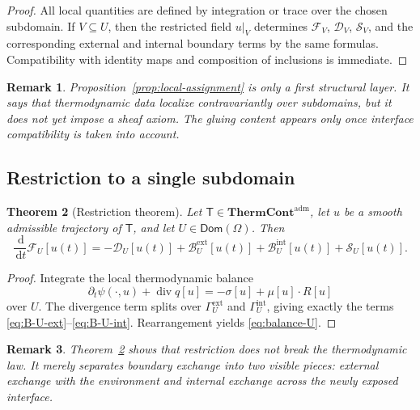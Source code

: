 \documentclass[10pt,a4paper]{amsart}
\newtheorem{theorem}{Theorem}[section]
\newtheorem{remark}[theorem]{Remark}
\newcommand{\Om}{\Omega}
\newcommand{\diver}{\operatorname{div}}
\newcommand{\dd}{\,\mathrm{d}}
\newcommand{\F}{\mathcal{F}}
\newcommand{\Diss}{\mathcal{D}}
\newcommand{\Bnd}{\mathcal{B}}
\newcommand{\Src}{\mathcal{S}}
\newcommand{\ThermAdm}{\mathbf{ThermCont}^{\mathrm{adm}}}
\begin{document}
\begin{proof}
All local quantities are defined by integration or trace over the chosen subdomain.
If \(V\subseteq U\), then the restricted field \(u|_V\) determines \(\F_V\),
\(\Diss_V\), \(\Src_V\), and the corresponding external and internal boundary terms
by the same formulas. Compatibility with identity maps and composition of inclusions
is immediate.
\end{proof}

\begin{remark}
Proposition~\ref{prop:local-assignment} is only a first structural layer. It says
that thermodynamic data localize contravariantly over subdomains, but it does not
yet impose a sheaf axiom. The gluing content appears only once interface
compatibility is taken into account.
\end{remark}

\subsection{Restriction to a single subdomain}

\begin{theorem}[Restriction theorem]\label{thm:restriction}
Let \(\mathsf{T}\in\ThermAdm\), let \(u\) be a smooth admissible trajectory of
\(\mathsf{T}\), and let \(U\in\mathsf{Dom}(\Om)\). Then
\begin{equation}\label{eq:balance-U}
\frac{\dd}{\dd t}\F_U[u(t)]
=
-\Diss_U[u(t)]
+\Bnd_U^{\mathrm{ext}}[u(t)]
+\Bnd_U^{\mathrm{int}}[u(t)]
+\Src_U[u(t)].
\end{equation}
\end{theorem}

\begin{proof}
Integrate the local thermodynamic balance
\[
\partial_t \psi(\cdot,u) + \diver q[u]
=
-\sigma[u] + \mu[u]\cdot R[u]
\]
over \(U\). The divergence term splits over \(\Gamma_U^{\mathrm{ext}}\) and
\(\Gamma_U^{\mathrm{int}}\), giving exactly the terms
\eqref{eq:B-U-ext}--\eqref{eq:B-U-int}. Rearrangement yields
\eqref{eq:balance-U}.
\end{proof}

\begin{remark}
Theorem~\ref{thm:restriction} shows that restriction does not break the
thermodynamic law. It merely separates boundary exchange into two visible pieces:
external exchange with the environment and internal exchange across the newly exposed
interface.
\end{remark}
\end{document}
